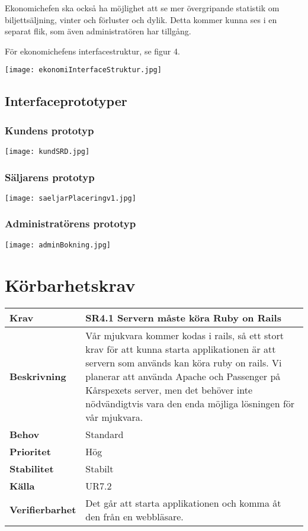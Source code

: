 \documentclass[a4paper, twoside, 11pt, titlepage]{article}
\begin{document}
		Ekonomichefen ska också ha möjlighet att se mer övergripande statistik om biljettsäljning, vinter och förluster och dylik. Detta kommer kunna ses i en separat flik, som även administratören har tillgång.

		För ekonomichefens interfacestruktur, se figur 4.

		\texttt{[image: ekonomiInterfaceStruktur.jpg]}

	\subsection{Interfaceprototyper}



		\subsubsection{Kundens prototyp}


		\texttt{[image: kundSRD.jpg]}

		\subsubsection{Säljarens prototyp}


		\texttt{[image: saeljarPlaceringv1.jpg]}

		\subsubsection{Administratörens prototyp}


		\texttt{[image: adminBokning.jpg]}

\clearpage
\section{Körbarhetskrav}


\begin{tabular} { p{2.6cm} p{12.5cm} }
	\hline
	\sffamily\textbf{Krav} & \sffamily\textbf{SR4.1 Servern måste köra Ruby on Rails } \\
	\hline
	\sffamily\textbf{Beskrivning} & Vår mjukvara kommer kodas i rails, så ett stort krav för att kunna starta applikationen är att servern som används kan köra ruby on rails. Vi planerar att använda Apache och Passenger på Kårspexets server, men det behöver inte nödvändigtvis vara den enda möjliga lösningen för vår mjukvara.  \\
	\hline
	\sffamily\textbf{Behov} & Standard  \\
	\hline
	\sffamily\textbf{Prioritet} & Hög  \\
	\hline
	\sffamily\textbf{Stabilitet} & Stabilt  \\
	\hline
	\sffamily\textbf{Källa} & UR7.2  \\
	\hline
	\sffamily\textbf{Verifierbarhet} & Det går att starta applikationen och komma åt den från en webbläsare.  \\
	\hline
\end{tabular}
\vspace{6mm}
\end{document}
